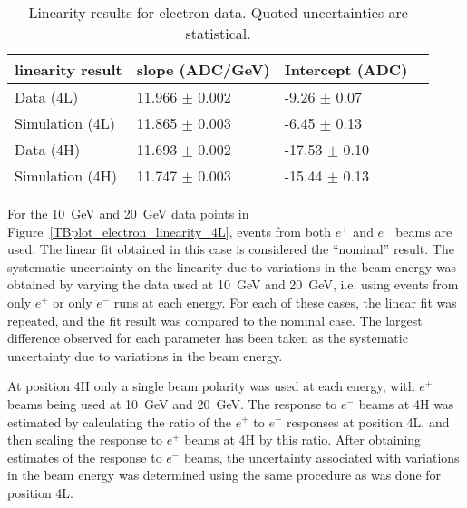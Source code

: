 \begin{table}[htb]
\begin{center}
\begin{tabular}{|l|l|l|l|}
\hline
linearity result & slope (ADC/GeV)& Intercept (ADC) \\
\hline
Data (4L) & 11.966 $\pm$ 0.002 & -9.26 $\pm$ 0.07 \\
Simulation (4L) & 11.865 $\pm$ 0.003 & -6.45 $\pm$ 0.13 \\
Data (4H) & 11.693 $\pm$ 0.002 & -17.53 $\pm$ 0.10 \\
Simulation (4H) & 11.747 $\pm$ 0.003 & -15.44 $\pm$ 0.13 \\
\hline
\end{tabular}
\caption[Electron linearity results]{Linearity results for electron data. Quoted uncertainties are statistical.}
\label{table_electron_c8_linearity}
\end{center}
\end{table}





For the 10~GeV and 20~GeV data points in Figure~\ref{TBplot_electron_linearity_4L}, events from both $e^+$ and $e^-$ beams are used. The linear fit obtained in this case is considered the ``nominal'' result. The systematic uncertainty on the linearity due to variations in the beam energy was obtained by varying the data used at 10~GeV and 20~GeV, i.e. using events from only $e^+$ or only $e^-$ runs at each energy. For each of these cases, the linear fit was repeated, and the fit result was compared to the nominal case. The largest difference observed for each parameter has been taken as the systematic uncertainty due to variations in the beam energy.
 
 At position 4H only a single beam polarity was used at each energy, with $e^+$ beams being used at 10~GeV and 20~GeV. The response to $e^-$ beams at 4H was estimated by calculating the ratio of the $e^+$ to $e^-$ responses at position 4L, and then scaling the response to $e^+$ beams at 4H by this ratio. After obtaining estimates of the response to $e^-$ beams, the uncertainty associated with variations in the beam energy was determined using the same procedure as was done for position 4L.


